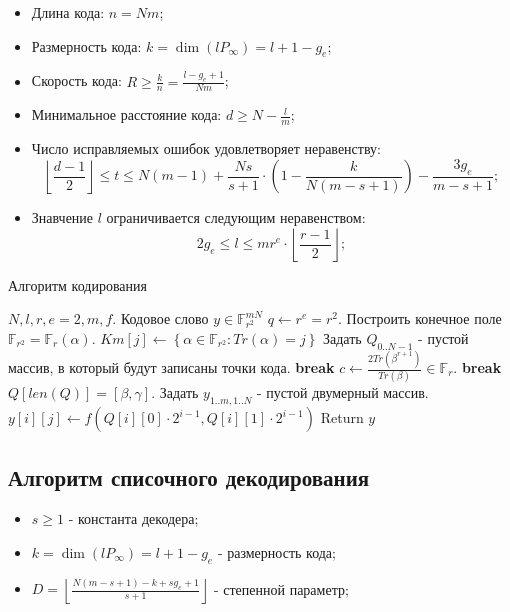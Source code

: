 \documentclass{article}
\newcommand{\Break}{\State \textbf{break} }
\def\F{\mathbb{F}}
\numberwithin{equation}{section}
\begin{document}
\begin{itemize}
	\item Длина кода: $ n = Nm $;
	\item Размерность кода: $ k = \dim(lP_{\infty}) = l+1-g_e $;
	\item Скорость кода: $ R \geq \frac{k}{n} = \frac{l-g_e+1}{Nm}$;
	\item Минимальное расстояние кода: $ d \geq N - \frac{l}{m} $;
	\item Число исправляемых ошибок удовлетворяет неравенству:
	\[
		\left\lfloor \frac{d-1}{2} \right\rfloor \leq t \leq N(m-1) + \frac{Ns}{s+1} \cdot \left( 1 - \frac{k}{N(m-s+1)} \right)  - \frac{3g_e}{m-s+1};
	\]
	\item Знавчение $ l $ ограничивается следующим неравенством:
	\[
		2g_e \leq l \leq mr^e \cdot \left\lfloor \frac{r-1}{2} \right\rfloor ;
	\]
\end{itemize}

\begin{algorithm}[H]
	\caption{Алгоритм кодирования}\label{alg:encode}
	\begin{algorithmic}[1]
		\Require $ N,l,r,e=2,m,f. $
		\Ensure $ \text{Кодовое слово } y \in \F_{r^2}^{mN} $
		\State $ q \gets r^e = r^2 $. Построить конечное поле $ \F_{r^2} = \F_r(\alpha) $.
			\State$ Km[j] \gets \left\lbrace \alpha \in \F_{r^2}: Tr(\alpha) = j \right\rbrace $
		\EndFor
		\State Задать $ Q_{0..N-1} $ - пустой массив, в который будут записаны точки кода.
	    		\Break
			\EndIf
			\State $ c \gets \frac{2Tr(\beta^{r+1})}{Tr(\beta)} \in \F_r $.
	    	\For{$ \gamma \in Km[c]  $}
				\If {$ len(Q) \geq N $}
					\Break
				\EndIf
				\State $ Q[len(Q)] = [\beta, \gamma]$.
			\EndFor
		\EndFor
		\State Задать $ y_{1..m,1..N} $ - пустой двумерный массив.
				\State $ y[i][j] \gets f(Q[i][0] \cdot 2^{i-1}, Q[i][1] \cdot 2^{i-1} ) $
			\EndFor
		\EndFor
		\State Return $ y $
	\end{algorithmic}
	
\end{algorithm}


\subsection{Алгоритм списочного декодирования}

\begin{itemize}
	\item $ s \geq 1 $ - константа декодера;
	\item $ k = \dim(lP_{\infty}) = l+1-g_e $ - размерность кода;
	\item $ D = \left\lfloor \frac{N(m-s+1)-k+sg_e+1}{s+1} \right\rfloor $ - степенной параметр;
\end{itemize}
\end{document}
